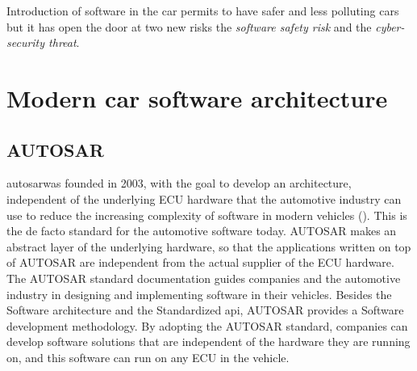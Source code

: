 Introduction of software in the car permits to have safer and less polluting cars but it has open the door at two new risks the \emph{software safety risk} and the \emph{cyber-security threat}. 

\section {Modern car software architecture}

\subsection {AUTOSAR}

\gls{autosar}\@ was founded in 2003, with the goal to develop an architecture, independent of the underlying ECU hardware that the automotive industry can use to reduce the increasing complexity of software in modern vehicles (\cite{AUTOSAR}). This is the de facto standard for the automotive software today. AUTOSAR makes an abstract layer of the underlying hardware, so that the applications written on top of AUTOSAR are independent from the actual supplier of the ECU hardware. The AUTOSAR standard documentation guides companies and the automotive industry in designing and implementing software in their vehicles. Besides the Software architecture and the Standardized \gls{api}\@, AUTOSAR provides a Software development methodology. By adopting the AUTOSAR standard, companies can develop software solutions that are independent of the hardware they are running on, and this software can run on any ECU in the vehicle. 
\bigskip

